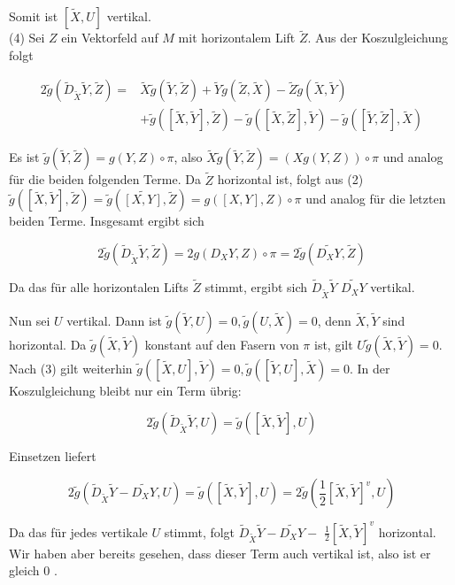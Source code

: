 \documentclass[10pt]{article}
\begin{document}
Somit ist $[\tilde{X}, U]$ vertikal.\\
(4) Sei $Z$ ein Vektorfeld auf $M$ mit horizontalem Lift $\tilde{Z}$. Aus der Koszulgleichung folgt

$$
\begin{aligned}
2 \tilde{g}\left(\tilde{D}_{\tilde{X}} \tilde{Y}, \tilde{Z}\right)= & \tilde{X} \tilde{g}(\tilde{Y}, \tilde{Z})+\tilde{Y} \tilde{g}(\tilde{Z}, \tilde{X})-\tilde{Z} \tilde{g}(\tilde{X}, \tilde{Y}) \\
& +\tilde{g}([\tilde{X}, \tilde{Y}], \tilde{Z})-\tilde{g}([\tilde{X}, \tilde{Z}], \tilde{Y})-\tilde{g}([\tilde{Y}, \tilde{Z}], \tilde{X})
\end{aligned}
$$

Es ist $\tilde{g}(\tilde{Y}, \tilde{Z})=g(Y, Z) \circ \pi$, also $\tilde{X} \tilde{g}(\tilde{Y}, \tilde{Z})=(X g(Y, Z)) \circ \pi$ und analog für die beiden folgenden Terme. Da $\tilde{Z}$ horizontal ist, folgt aus (2) $\tilde{g}([\tilde{X}, \tilde{Y}], \tilde{Z})=\tilde{g}(\widetilde{[X, Y]}, \tilde{Z})=g([X, Y], Z) \circ \pi$ und analog für die letzten beiden Terme. Insgesamt ergibt sich

$$
2 \tilde{g}\left(\tilde{D}_{\tilde{X}} \tilde{Y}, \tilde{Z}\right)=2 g\left(D_{X} Y, Z\right) \circ \pi=2 \tilde{g}\left(\widetilde{D_{X} Y}, \tilde{Z}\right)
$$

Da das für alle horizontalen Lifts $\tilde{Z}$ stimmt, ergibt sich $\tilde{D}_{\tilde{X}} \tilde{Y}$ $\widetilde{D_{X} Y}$ vertikal.

Nun sei $U$ vertikal. Dann ist $\tilde{g}(\tilde{Y}, U)=0, \tilde{g}(U, \tilde{X})=0$, denn $\tilde{X}, \tilde{Y}$ sind horizontal. Da $\tilde{g}(\tilde{X}, \tilde{Y})$ konstant auf den Fasern von $\pi$ ist, gilt $U \tilde{g}(\tilde{X}, \tilde{Y})=0$. Nach (3) gilt weiterhin $\tilde{g}([\tilde{X}, U], \tilde{Y})=0, \tilde{g}([\tilde{Y}, U], \tilde{X})=0$. In der Koszulgleichung bleibt nur ein Term übrig:

$$
2 \tilde{g}\left(\tilde{D}_{\tilde{X}} \tilde{Y}, U\right)=\tilde{g}([\tilde{X}, \tilde{Y}], U)
$$

Einsetzen liefert

$$
2 \tilde{g}\left(\tilde{D}_{\tilde{X}} \tilde{Y}-\widetilde{D_{X} Y}, U\right)=\tilde{g}([\tilde{X}, \tilde{Y}], U)=2 \tilde{g}\left(\frac{1}{2}[\tilde{X}, \tilde{Y}]^{v}, U\right)
$$

Da das für jedes vertikale $U$ stimmt, folgt $\tilde{D}_{\tilde{X}} \tilde{Y}-\widetilde{D_{X} Y}-$ $\frac{1}{2}[\tilde{X}, \tilde{Y}]^{v}$ horizontal. Wir haben aber bereits gesehen, dass dieser Term auch vertikal ist, also ist er gleich 0 .
\end{document}
